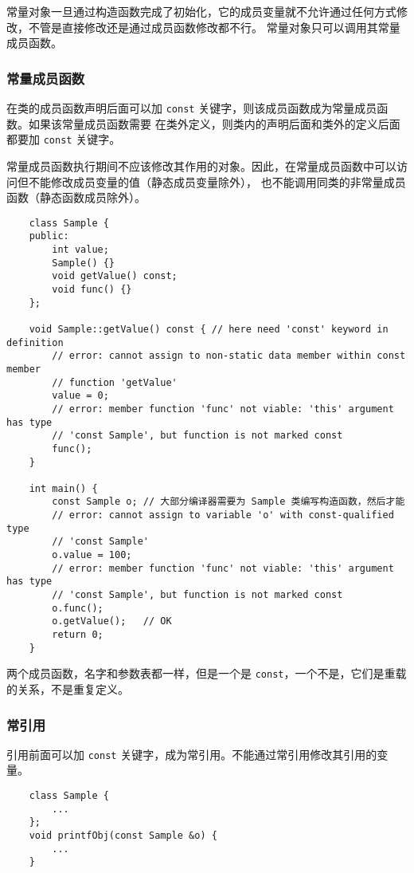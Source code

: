\documentclass[UTF8]{ctexart}
\begin{document}
常量对象一旦通过构造函数完成了初始化，它的成员变量就不允许通过任何方式修改，不管是直接修改还是通过成员函数修改都不行。
常量对象只可以调用其常量成员函数。

\subsubsection{常量成员函数}
在类的成员函数声明后面可以加 \texttt{const} 关键字，则该成员函数成为常量成员函数。如果该常量成员函数需要
在类外定义，则类内的声明后面和类外的定义后面都要加 \texttt{const} 关键字。

常量成员函数执行期间不应该修改其作用的对象。因此，在常量成员函数中可以访问但不能修改成员变量的值（静态成员变量除外），
也不能调用同类的非常量成员函数（静态函数成员除外）。

\begin{verbatim}
    class Sample {
    public:
        int value;
        Sample() {}
        void getValue() const;
        void func() {}
    };

    void Sample::getValue() const { // here need 'const' keyword in definition
        // error: cannot assign to non-static data member within const member
        // function 'getValue'
        value = 0;
        // error: member function 'func' not viable: 'this' argument has type
        // 'const Sample', but function is not marked const
        func();
    }

    int main() {
        const Sample o; // 大部分编译器需要为 Sample 类编写构造函数，然后才能
        // error: cannot assign to variable 'o' with const-qualified type
        // 'const Sample'
        o.value = 100;
        // error: member function 'func' not viable: 'this' argument has type
        // 'const Sample', but function is not marked const
        o.func();
        o.getValue();   // OK
        return 0;
    }
\end{verbatim}

两个成员函数，名字和参数表都一样，但是一个是 \texttt{const}，一个不是，它们是重载的关系，不是重复定义。

\subsubsection{常引用}
引用前面可以加 \texttt{const} 关键字，成为常引用。不能通过常引用修改其引用的变量。
\begin{verbatim}
    class Sample {
        ...
    };
    void printfObj(const Sample &o) {
        ...
    }
\end{verbatim}
\end{document}
